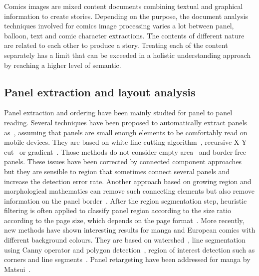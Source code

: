 
Comics images are mixed content documents combining textual and graphical information to create stories.
Depending on the purpose, the document analysis techniques involved for comics image processing varies a lot between panel, balloon, text and comic character extractions.
The contents of different nature are related to each other to produce a story.
Treating each of the content separately has a limit that can be exceeded in a holistic understanding approach by reaching a higher level of semantic.



\subsection{Panel extraction and layout analysis}
\label{sec:sota:layout_panel}

% 

Panel extraction and ordering have been mainly studied for panel to panel reading.
Several techniques have been proposed to automatically extract panels as~\cite{In11}, assuming that panels are small enough elements to be comfortably read on mobile devices.
They are based on white line cutting algorithm~\cite{Duda72,Luyuan2014Automatic,Chan2007Automatic}, recursive X-Y cut~\cite{Han07} or gradient~\cite{Tan07}.
Those methods do not consider empty area~\cite{In11} and border free panels.
These issues have been corrected by connected component approaches~\cite{Arai10} 
but they are sensible to region that sometimes connect several panels and increase the detection error rate.
Another approach based on growing region and morphological mathematics can remove such connecting elements but also remove information on the panel border~\cite{Ho2012}.
After the region segmentation step, heuristic filtering is often applied to classify panel region according to the size ratio according to the page size, which depends on the page format~\cite{Arai11,Ho2012}.
More recently, new methods have shown interesting results for manga and European comics with different background colours.
They are based on watershed~\cite{ponsard2012ocr}, line segmentation using Canny operator and polygon detection~\cite{Luyuan2014Automatic}, region of interest detection such as corners and line segments~\cite{stommel2012segmentation,Tsai2013Adaptive}.
Panel retargeting have been addressed for manga by Matsui~\cite{Matsui2011}.

